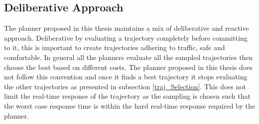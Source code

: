 
\subsection{Deliberative Approach}
The planner proposed in this thesis maintains a mix of deliberative and reactive approach. Deliberative by evaluating a trajectory completely  before committing to it, this is important to create trajectories adhering to traffic, safe and comfortable. In general all the planners evaluate all the sampled trajectories then choose the best based on different costs. The planner proposed in this thesis does not follow this convention and once it finds a best trajectory it stops evaluating the other trajectories as presented in subsection \ref{traj_Selection}. This does not limit the real-time response of the trajectory as the sampling is chosen such that the worst case response time is within the hard real-time response required by the planner. 






